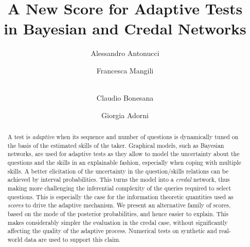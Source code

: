 \documentclass[runningheads]{llncs}
\begin{document}
\title{A New Score for Adaptive Tests\\ in Bayesian and Credal Networks}
\author{Alessandro Antonucci \and
Francesca Mangili \and \\
Claudio Bonesana \and
Giorgia Adorni}
\maketitle
\begin{abstract}
A test is \emph{adaptive} when its sequence and number of questions is dynamically tuned on the basis of the estimated skills of the taker. Graphical models, such as Bayesian networks, are used for adaptive tests as they allow to model the uncertainty about the questions and the skills in an explainable fashion, especially when coping with multiple skills. A better elicitation of the uncertainty in the question/skills relations can be achieved by interval probabilities. This turns the model into a \emph{credal} network, thus making more challenging the inferential complexity of the queries required to select questions. This is especially the case for the information theoretic quantities used as \emph{scores} to drive the adaptive mechanism. We present an alternative family of scores, based on the mode of the posterior probabilities, and hence easier to explain. This makes considerably simpler the evaluation in the credal case, without significantly affecting the quality of the adaptive process. Numerical tests on synthetic and real-world data are used to support this claim.
\end{abstract}
\end{document}
